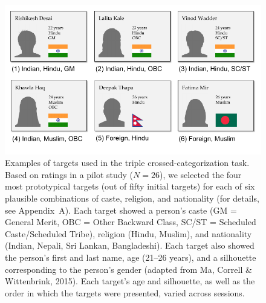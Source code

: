 \documentclass[12pt, a4paper]{article}
\begin{document}
\begin{figure}
\centering
\includegraphics[scale=1]{../figures/figure-2}
\caption{Examples of targets used in the triple crossed-categorization task. Based on ratings in a pilot study ($N = 26$), we selected the four most prototypical targets (out of fifty initial targets) for each of six plausible combinations of caste, religion, and nationality (for details, see Appendix~A). Each target showed a person's caste (GM = General Merit, OBC = Other Backward Class, SC/ST = Scheduled Caste/Scheduled Tribe), religion (Hindu, Muslim), and nationality (Indian, Nepali, Sri Lankan, Bangladeshi). Each target also showed the person's first and last name, age (21--26 years), and a silhouette corresponding to the person's gender (adapted from Ma, Correll \& Wittenbrink, 2015). Each target's age and silhouette, as well as the order in which the targets were presented, varied across sessions.}
\label{fig:f2}
\end{figure}
\end{document}
